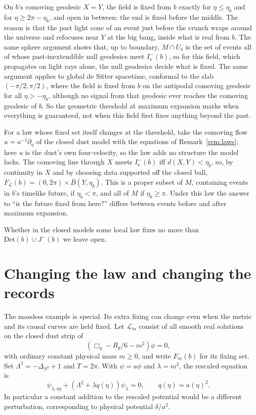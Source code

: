 \documentclass[11pt]{article}
\theoremstyle{definition}
\newcommand{\Is}{I^-_{\mathrm s}}
\newcommand{\Det}{\mathrm{Det}}
\begin{document}
On $b$'s comoving geodesic $X=Y$, the field is fixed from $b$ exactly for
$\eta\le\eta_b$ and for $\eta\ge2\pi-\eta_b$, and open in between: the end is
fixed before the middle. The reason is that the past light cone of an event
just before the crunch wraps around the universe and refocuses near $Y$ at the
big bang, inside what is real from $b$. The same sphere argument shows that,
up to boundary, $M\cap U_b$ is the set
of events all of whose past-inextendible null geodesics meet $\Is(b)$, so for
this field, which propagates on light rays alone, the null geodesics decide
what is fixed. The same argument applies to global de Sitter spacetime,
conformal to the slab $(-\pi/2,\pi/2)$, where the field is fixed from $b$ on the
antipodal comoving geodesic for all $\eta>-\eta_b$, although no signal from that
geodesic ever reaches the comoving geodesic of $b$. So the geometric threshold
at maximum expansion marks when everything is guaranteed, not when this field
first fixes anything beyond the past.

For a law whose fixed set itself changes at the threshold, take the comoving
flow $u=a^{-1}\partial_\eta$ of the closed dust model with the equations of
Remark~\ref{rem:laws}; here $u$ is the dust's own four-velocity, so the law
adds no structure the model lacks. The comoving line through $X$ meets $\Is(b)$ iff
$d(X,Y)<\eta_b$, so, by continuity in $X$ and by choosing data supported off
the closed ball, $F_{\mathcal L}(b)=(0,2\pi)\times\bar B(Y,\eta_b)$. This is a
proper subset of $M$, containing events in $b$'s timelike future, if
$\eta_b<\pi$, and all of $M$ if $\eta_b\ge\pi$. Under this law the answer to
``is the future fixed from here?'' differs between events before and after
maximum expansion.

Whether in the closed models some local law fixes no more than
$\Det(b)\cup J^-(b)$ we leave open.

\section{Changing the law and changing the records}\label{sec:mass}

The massless example is special. Its extra fixing can change even when the
metric and its causal curves are held fixed. Let $\mathcal L_m$ consist of
all smooth real solutions on the closed dust strip of
\[
 (\Box_g-R_g/6-m^2)\phi=0,
\]
with ordinary constant physical mass $m\ge0$, and write $F_m(b)$ for its
fixing set. Set $\Lambda^2=-\Delta_{S^3}+1$ and $T=2\pi$. With
$\psi=a\phi$ and $\lambda=m^2$, the rescaled equation is
\begin{equation}\label{eq:mass}
 \psi_{\lambda,\eta\eta}+(\Lambda^2+\lambda q(\eta))\psi_\lambda=0,
 \qquad q(\eta)=a(\eta)^2.
\end{equation}
In particular a constant addition to the rescaled potential would be a
different perturbation, corresponding to physical potential $\delta/a^2$.
\end{document}
